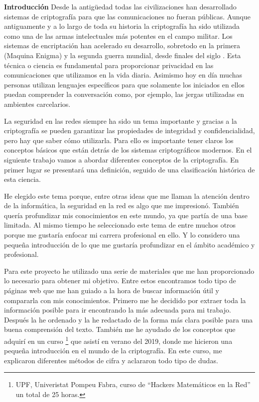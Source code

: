 \documentclass{article}
\newcommand{\RomanNumeralCaps}[1]
    {\MakeUppercase{\romannumeral #1}}
\begin{document}
\newpage
\tableofcontents
\newpage



\centering \textbf{\large Introducción}
\justify
Desde la antigüedad todas las civilizaciones han desarrollado sistemas de criptografía para que las comunicaciones no fueran públicas. Aunque antiguamente y a lo largo de toda su historia la criptografía ha sido utilizada como una de las armas intelectuales más potentes en el campo militar. Los sistemas de encriptación han acelerado su desarrollo, sobretodo en la primera (Maquina Enigma) y la segunda guerra mundial, desde finales del siglo \RomanNumeralCaps{20}. Esta técnica o ciencia es fundamental para proporcionar privacidad en las comunicaciones que utilizamos en la vida diaria. Asimismo hoy en día muchas personas utilizan lenguajes específicos para que solamente los iniciados en ellos puedan comprender la conversación como, por ejemplo, las jergas utilizadas en ambientes carcelarios. 

La seguridad en las redes siempre ha sido un tema importante y gracias a la criptografía se pueden garantizar las propiedades de integridad y confidencialidad, pero hay que saber cómo utilizarla. Para ello es importante tener claros los conceptos básicos que están detrás de los sistemas criptográficos modernos. En el siguiente trabajo vamos a abordar diferentes conceptos de la criptografía. En primer lugar se presentará una definición, seguido de una clasificación histórica de esta ciencia. 

He elegido este tema porque, entre otras ideas que me llaman la atención dentro de la informática, la seguridad en la red es algo que me impresionó. También quería profundizar mis conocimientos en este mundo, ya que partía de una base limitada. Al mismo tiempo he seleccionado este tema de entre muchos otros porque me gustaría enfocar mi carrera profesional en ello. Y lo considero una pequeña introducción de lo que me gustaría profundizar en el ámbito académico y profesional. 


Para este proyecto he utilizado una serie de materiales que me han proporcionado lo necesario para obtener mi objetivo. Entre estos encontramos todo tipo de páginas web que me han guiado a la hora de buscar información útil y compararla con mis conocimientos. Primero me he decidido por extraer toda la información posible para ir encontrando la más adecuada para mi trabajo. Después la he ordenado y la he redactado de la forma más clara posible para una buena comprensión del texto. También me he ayudado de los conceptos que adquirí en un curso \footnote{UPF, Univeristat Pompeu Fabra, curso de ``Hackers Matemáticos en la Red'' un total de 25 horas.} que asistí en verano del 2019, donde me hicieron una pequeña introducción en el mundo de la criptografía. En este curso, me explicaron diferentes métodos de cifra y aclararon todo tipo de dudas.
\end{document}
